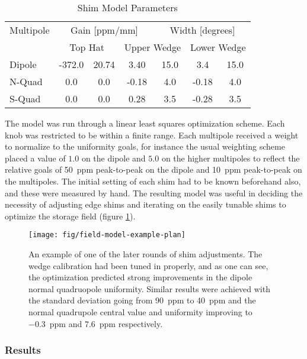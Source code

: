\begin{table}[h]
\label{tab:shim-model-params}
\caption{Shim Model Parameters}
\centering
\begin{tabular}{| l | c c | c c | c c |}
    \hline
    Multipole & \multicolumn{3}{c}{Gain [ppm/mm]} & \multicolumn{3}{c}{Width [degrees]} \vline \\
    & \multicolumn{2}{c}{Top Hat} & \multicolumn{2}{c}{Upper Wedge} & \multicolumn{2}{c}{Lower Wedge} \vline \\
    \hline
    Dipole & -372.0 & 20.74 & 3.40  & 15.0  & 3.4 & 15.0 \\
    N-Quad & 0.0    & 0.0   & -0.18 & 4.0 & -0.18 & 4.0  \\
    S-Quad & 0.0    & 0.0   & 0.28  & 3.5 & -0.28 & 3.5  \\
    \hline
\end{tabular}
\end{table}

The model was run through a linear least squares optimization scheme.  Each knob was restricted to be within a finite range.  Each multipole received a weight to normalize to the uniformity goals, for instance the usual weighting scheme placed a value of $1.0$ on the dipole and $5.0$ on the higher multipoles to reflect the relative goals of \SI{50}{ppm} peak-to-peak on the dipole and \SI{10}{ppm} peak-to-peak on the multipoles.  The initial setting of each shim had to be known beforehand also, and these were measured by hand.  The resulting model was useful in deciding the necessity of adjusting edge shims and iterating on the easily tunable shims to optimize the storage field (figure \ref{fig:field-model-example-plan}).

\begin{figure}
\centering
\texttt{[image: fig/field-model-example-plan]}
\caption{
    An example of one of the later rounds of shim adjustments.  The wedge calibration had been tuned in properly, and as one can see, the optimization predicted strong improvements in the dipole normal quadruopole uniformity. Similar results were achieved with the standard deviation going from \SI{90}{ppm} to \SI{40}{ppm} and the normal quadrupole central value and uniformity improving to \SI{-0.3}{ppm} and \SI{7.6}{ppm} respectively.
    \label{fig:field-model-example-plan}
}
\end{figure}

\subsubsection{Results}

